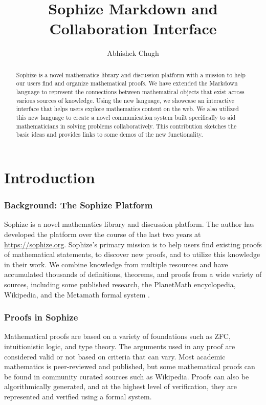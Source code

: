 \documentclass[a4paper]{article}
\title{Sophize Markdown and Collaboration Interface }
\author{ Abhishek Chugh }
\begin{document}
\maketitle

\begin{abstract}
Sophize is a novel mathematics library and discussion platform with a mission to help our users find and organize mathematical proofs. We have extended the Markdown language to represent the connections between mathematical objects that exist across various sources of knowledge. Using the new language, we showcase an interactive interface that helps users explore mathematics content on the web. We also utilized this new language to create a novel communication system built specifically to aid mathematicians in solving problems collaboratively. This contribution sketches the basic ideas and provides links to some demos of the new functionality.

\end{abstract}

\vskip 32pt

\section{Introduction}

\subsubsection*{Background: The Sophize Platform}

Sophize is a novel mathematics library and discussion platform. The author has developed the platform over the course of the last two years at \url{https://sophize.org}. Sophize's primary mission is to help users find existing proofs of mathematical statements, to discover new proofs, and to utilize this knowledge in their work. We combine knowledge from multiple resources and have accumulated thousands of definitions, theorems, and proofs from a wide variety of sources, including some published research, the PlanetMath encyclopedia, Wikipedia, and the Metamath formal system \cite{metamath}.

\subsubsection*{Proofs in Sophize}

Mathematical proofs are based on a variety of foundations such as ZFC, intuitionistic logic, and type theory. The arguments used in any proof are considered valid or not based on criteria that can vary. Most academic mathematics is peer-reviewed and published, but some mathematical proofs can be found in community curated sources such as Wikipedia. Proofs can also be algorithmically generated, and at the highest level of verification, they are represented and verified using a formal system. 
\end{document}
